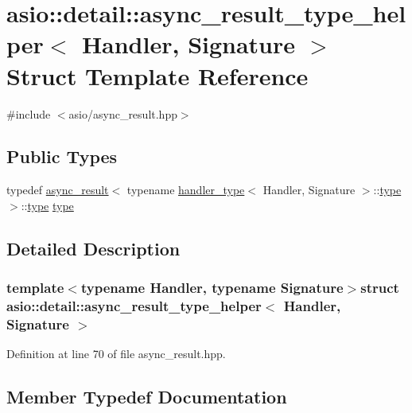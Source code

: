 \hypertarget{structasio_1_1detail_1_1async__result__type__helper}{}\section{asio\+:\+:detail\+:\+:async\+\_\+result\+\_\+type\+\_\+helper$<$ Handler, Signature $>$ Struct Template Reference}
\label{structasio_1_1detail_1_1async__result__type__helper}


{\ttfamily \#include $<$asio/async\+\_\+result.\+hpp$>$}

\subsection*{Public Types}
\begin{DoxyCompactItemize}
\item 
typedef \hyperlink{classasio_1_1async__result}{async\+\_\+result}$<$ typename \hyperlink{structasio_1_1handler__type}{handler\+\_\+type}$<$ Handler, Signature $>$\+::\hyperlink{structasio_1_1detail_1_1async__result__type__helper_ab4aec755509972e47a6ea9d6f88b5b74}{type} $>$\+::\hyperlink{structasio_1_1detail_1_1async__result__type__helper_ab4aec755509972e47a6ea9d6f88b5b74}{type} \hyperlink{structasio_1_1detail_1_1async__result__type__helper_ab4aec755509972e47a6ea9d6f88b5b74}{type}
\end{DoxyCompactItemize}


\subsection{Detailed Description}
\subsubsection*{template$<$typename Handler, typename Signature$>$struct asio\+::detail\+::async\+\_\+result\+\_\+type\+\_\+helper$<$ Handler, Signature $>$}



Definition at line 70 of file async\+\_\+result.\+hpp.



\subsection{Member Typedef Documentation}
\hypertarget{structasio_1_1detail_1_1async__result__type__helper_ab4aec755509972e47a6ea9d6f88b5b74}{}
